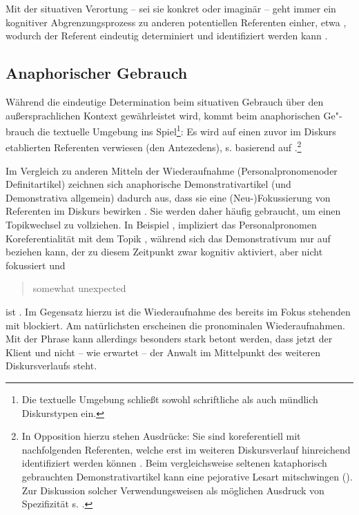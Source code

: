 Mit der situativen Verortung -- sei sie konkret oder imaginär -- geht immer ein kognitiver Abgrenzungsprozess zu anderen potentiellen Referenten einher, etwa   \parencite[vgl.][70]{Bisle-Muller1991}, wodurch der Referent eindeutig determiniert und identifiziert werden kann \parencite{Hoffmann2009}. 

 
\subsection{Anaphorischer Gebrauch}\label{sec:anaphorisch}

Während die eindeutige Determination beim situativen Gebrauch über den außersprachlichen Kontext gewährleistet wird, kommt beim anaphorischen Ge"-brauch die textuelle Umgebung ins Spiel\footnote{Die textuelle Umgebung schließt sowohl schriftliche als auch mündlich Diskurstypen ein.}: Es wird auf einen zuvor im Diskurs etablierten Referenten verwiesen (den Antezedens), s.  basierend auf \textcite[][229]{Himmelmann1996}.{\footnote{In Opposition hierzu stehen  Ausdrücke: Sie sind koreferentiell mit nachfolgenden Referenten, welche erst im weiteren Diskursverlauf  hinreichend identifiziert werden können \parencite[s.][161-162]{Veldre-Gerner2007}. Beim vergleichsweise seltenen kataphorisch gebrauchten Demonstrativartikel kann eine pejorative Lesart mitschwingen (). Zur Diskussion solcher Verwendungsweisen als möglichen Ausdruck von Spezifizität s. \textcite[533]{deMulder2011}.}}

\begin{exe}
	\ex \label{ex:anaph} 
\end{exe}

Im Vergleich zu anderen Mitteln der Wiederaufnahme (Personalpronomen\linebreak oder Definitartikel) zeichnen sich anaphorische Demonstrativartikel (und Demonstrativa allgemein) dadurch aus, dass sie eine (Neu-)Fokussierung von Referenten im Diskurs bewirken \parencite [s. u.a.][]{Ehlich1979,Prince1981,Gundel1993,Comrie1997,Himmelmann1996,Diessel1999,Kibrik2011}. Sie werden daher häufig gebraucht, um einen Topikwechsel zu vollziehen. In Beispiel  \parencite[angelehnt an][96]{Diessel1999}, impliziert das Personalpronomen  Koreferentialität mit dem Topik , während sich das Demonstrativum  nur auf  beziehen kann, der zu diesem Zeitpunkt zwar kognitiv aktiviert, aber nicht fokussiert und \blockcquote[96]{Diessel1999}{somewhat unexpected} ist \parencite[vgl. hierzu][278-279]{Gundel1993}. Im Gegensatz hierzu ist die Wiederaufnahme des bereits im Fokus stehenden  mit  blockiert. Am natürlichsten erscheinen die pronominalen Wiederaufnahmen. Mit der Phrase  kann allerdings besonders stark betont werden, dass jetzt der Klient und nicht -- wie erwartet -- der Anwalt im Mittelpunkt des weiteren Diskursverlaufs steht.   

